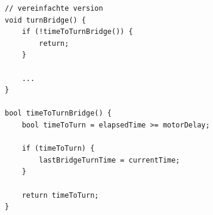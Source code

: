\begin{minipage}{\linewidth}
\begin{lstlisting}
// vereinfachte version
void turnBridge() {
    if (!timeToTurnBridge()) {
        return;
    }
    
    ...
}

bool timeToTurnBridge() {
    bool timeToTurn = elapsedTime >= motorDelay;

    if (timeToTurn) {
        lastBridgeTurnTime = currentTime;
    }

    return timeToTurn;
}
\end{lstlisting}
\end{minipage}